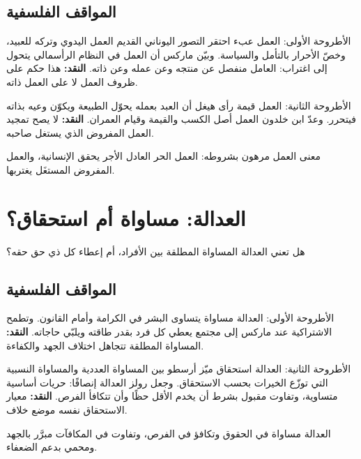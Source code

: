 \documentclass[12pt, twoside, openright]{book}
\begin{document}
\subsection*{المواقف الفلسفية}
\begin{positionbox}{الأطروحة الأولى: العمل عبء}
احتقر التصور اليوناني القديم العمل اليدوي وتركه للعبيد، وخصّ الأحرار بالتأمل والسياسة. وبيّن ماركس أن العمل في النظام الرأسمالي يتحول إلى اغتراب: العامل منفصل عن منتجه وعن عمله وعن ذاته. \textbf{النقد:} هذا حكم على ظروف العمل لا على العمل ذاته.
\end{positionbox}
\begin{positionbox}{الأطروحة الثانية: العمل قيمة}
رأى هيغل أن العبد بعمله يحوّل الطبيعة ويكوّن وعيه بذاته فيتحرر. وعدّ ابن خلدون العمل أصل الكسب والقيمة وقيام العمران. \textbf{النقد:} لا يصح تمجيد العمل المفروض الذي يستغل صاحبه.
\end{positionbox}
\begin{synthbox}
معنى العمل مرهون بشروطه: العمل الحر العادل الأجر يحقق الإنسانية، والعمل المفروض المستغَل يغتربها.
\end{synthbox}

\section{العدالة: مساواة أم استحقاق؟}
\begin{problembox}
هل تعني العدالة المساواة المطلقة بين الأفراد، أم إعطاء كل ذي حق حقه؟
\end{problembox}
\subsection*{المواقف الفلسفية}
\begin{positionbox}{الأطروحة الأولى: العدالة مساواة}
يتساوى البشر في الكرامة وأمام القانون. وتطمح الاشتراكية عند ماركس إلى مجتمع يعطي كل فرد بقدر طاقته ويلبّي حاجاته. \textbf{النقد:} المساواة المطلقة تتجاهل اختلاف الجهد والكفاءة.
\end{positionbox}
\begin{positionbox}{الأطروحة الثانية: العدالة استحقاق}
ميّز أرسطو بين المساواة العددية والمساواة النسبية التي توزّع الخيرات بحسب الاستحقاق. وجعل رولز العدالة إنصافًا: حريات أساسية متساوية، وتفاوت مقبول بشرط أن يخدم الأقل حظًا وأن تتكافأ الفرص. \textbf{النقد:} معيار الاستحقاق نفسه موضع خلاف.
\end{positionbox}
\begin{synthbox}
العدالة مساواة في الحقوق وتكافؤ في الفرص، وتفاوت في المكافآت مبرَّر بالجهد ومحمي بدعم الضعفاء.
\end{synthbox}
\end{document}

